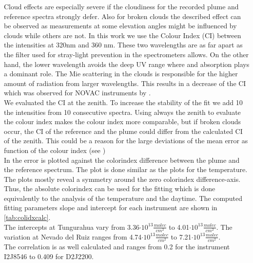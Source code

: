Cloud effects are especially severe if the cloudiness for the recorded plume and reference spectra strongly defer. Also for broken clouds the described effect can be observed as measurements at some elevation angles might be influenced by clouds while others are not.
In this work we use the Colour Index (CI) between the intensities at 320nm and 360 nm.
These two wavelengths are as far apart as the filter used for stray-light prevention in the spectrometers allows.
On the other hand, the lower wavelength avoids the deep UV range where  and   absorption plays a dominant role.
The Mie scattering in the clouds is responsible for the higher amount of radiation from larger wavelengths. This results in a decrease of the CI which was observed for NOVAC instruments by \citet{lubcke2014optical}.\\
We evaluated the CI at the zenith. To increase the stability of the fit we add 10 the intensities from 10 consecutive spectra. Using always the zenith to evaluate the colour index makes the colour index more comparable, but if broken clouds occur, the CI of the reference and the plume could differ from the calculated CI of the zenith. This could be a reason for the large deviations of the mean  error as function of the colour index (see )\\
In  the  error is plotted against the colorindex difference between the plume and the reference spectrum. The plot is done similar as the plots for the temperature.
The plots mostly reveal a symmetry around the zero colorindex difference-axis. Thus, the absolute colorindex can be used for the fitting which is done equivalently to the analysis of the temperature and the daytime. The computed fitting parameters slope and intercept for each instrument are shown in \cref{tab:colidxcalc}. \\
The intercepts at Tungurahua vary from 3.36$\cdot10^{13}\frac{molec}{cm^2}$ to 4.01$\cdot10^{13}\frac{molec}{cm^2}$. The variation at Nevado del Ruiz ranges from  4.74$\cdot10^{13}\frac{molec}{cm^2}$ to 7.21$\cdot10^{13}\frac{molec}{cm^2}$.\\
The correlation is as well calculated and ranges from 0.2 for the instrument I2J8546 to  0.409 for D2J2200.\\
